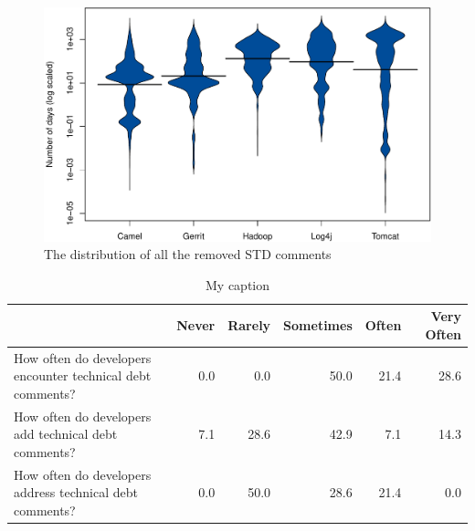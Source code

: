 \begin{figure}[thb!]
	\centering
	\includegraphics[width=\columnwidth]{figures/test/removed_all_STD_comments.pdf}
	\caption{The distribution of all the removed STD comments}
	\label{fig:removed_all_std_comments}
\end{figure}







\begin{table}[]
	\centering
	\caption{My caption}
	\label{my-label}
	\begin{tabular}{@{}lrrrrr@{}}
		\toprule
		\textbf{} & \textbf{Never} & \textbf{Rarely} & \textbf{Sometimes} & \textbf{Often} & \textbf{Very Often} \\ \midrule
		How often do developers encounter technical debt comments? & 0.0 & 0.0 & 50.0 & 21.4 & 28.6 \\
		How often do developers add technical debt comments? & 7.1 & 28.6 & 42.9 & 7.1 & 14.3 \\
		How often do developers address technical debt comments? & 0.0 & 50.0 & 28.6 & 21.4 & 0.0 \\ \bottomrule
	\end{tabular}
\end{table}




